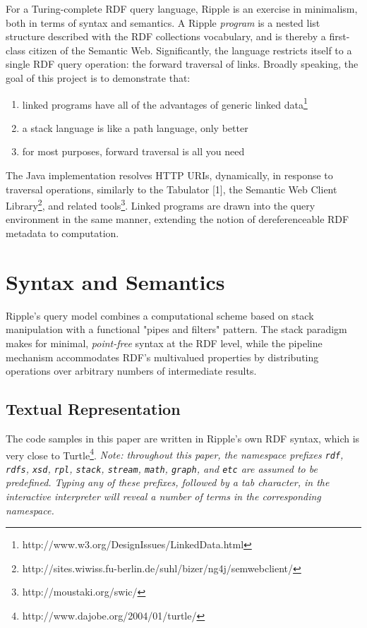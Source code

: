 \documentclass[runningheads]{llncs}
\begin{document}
For a Turing-complete RDF query language, Ripple is an exercise in minimalism, both in terms of syntax and semantics.  A Ripple \textit{program} is a nested list structure described with the RDF collections vocabulary, and is thereby a first-class citizen of the Semantic Web.  Significantly, the language restricts itself to a single RDF query operation: the forward traversal of links.  Broadly speaking, the goal of this project is to demonstrate that:
\begin{enumerate}
\item linked programs have all of the advantages of generic linked data\footnote{http://www.w3.org/DesignIssues/LinkedData.html}
\item a stack language is like a path language, only better
\item for most purposes, forward traversal is all you need
\end{enumerate}

The Java implementation resolves HTTP URIs, dynamically, in response to traversal operations, similarly to the Tabulator [1], the Semantic Web Client Library\footnote{http://sites.wiwiss.fu-berlin.de/suhl/bizer/ng4j/semwebclient/}, and related tools\footnote{http://moustaki.org/swic/}.  Linked programs are drawn into the query environment in the same manner, extending the notion of dereferenceable RDF metadata to computation.


\section{Syntax and Semantics}

Ripple's query model combines a computational scheme based on stack manipulation with a functional "pipes and filters" pattern.  The stack paradigm makes for minimal, \textit{point-free} syntax at the RDF level, while the pipeline mechanism accommodates RDF's multivalued properties by distributing operations over arbitrary numbers of intermediate results.

\subsection{Textual Representation}
The code samples in this paper are written in Ripple's own RDF syntax, which is very close to Turtle\footnote{http://www.dajobe.org/2004/01/turtle/}.
\newline
\textit{Note: throughout this paper, the namespace prefixes \texttt{rdf}, \texttt{rdfs}, \texttt{xsd}, \texttt{rpl}, \texttt{stack}, \texttt{stream}, \texttt{math}, \texttt{graph}, and \texttt{etc} are assumed to be predefined.  Typing any of these prefixes, followed by a tab character, in the interactive interpreter will reveal a number of terms in the corresponding namespace.}
\newline
\end{document}
